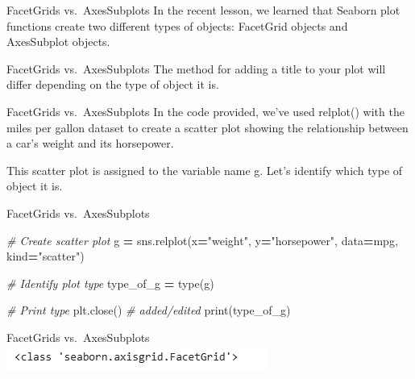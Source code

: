 \documentclass[
  ignorenonframetext,
]{beamer}
\newenvironment{Shaded}{\begin{snugshade}}{\end{snugshade}}
\newcommand{\BuiltInTok}[1]{#1}
\newcommand{\CommentTok}[1]{\textcolor[rgb]{0.56,0.35,0.01}{\textit{#1}}}
\newcommand{\NormalTok}[1]{#1}
\newcommand{\OperatorTok}[1]{\textcolor[rgb]{0.81,0.36,0.00}{\textbf{#1}}}
\newcommand{\StringTok}[1]{\textcolor[rgb]{0.31,0.60,0.02}{#1}}
\begin{document}
\begin{frame}{FacetGrids vs.~AxesSubplots}
\label{facetgrids-vs.-axessubplots}
In the recent lesson, we learned that Seaborn plot functions create two
different types of objects: FacetGrid objects and AxesSubplot objects.
\end{frame}

\begin{frame}{FacetGrids vs.~AxesSubplots}
\label{facetgrids-vs.-axessubplots-1}
The method for adding a title to your plot will differ depending on the
type of object it is.
\end{frame}

\begin{frame}{FacetGrids vs.~AxesSubplots}
\label{facetgrids-vs.-axessubplots-2}
In the code provided, we've used relplot() with the miles per gallon
dataset to create a scatter plot showing the relationship between a
car's weight and its horsepower.

This scatter plot is assigned to the variable name g. Let's identify
which type of object it is.
\end{frame}

\begin{frame}[fragile]{FacetGrids vs.~AxesSubplots}
\label{facetgrids-vs.-axessubplots-3}

\begin{Shaded}
\begin{Highlighting}[]
\CommentTok{\# Create scatter plot}
\NormalTok{g }\OperatorTok{=}\NormalTok{ sns.relplot(x}\OperatorTok{=}\StringTok{"weight"}\NormalTok{, }
\NormalTok{                y}\OperatorTok{=}\StringTok{"horsepower"}\NormalTok{, }
\NormalTok{                data}\OperatorTok{=}\NormalTok{mpg,}
\NormalTok{                kind}\OperatorTok{=}\StringTok{"scatter"}\NormalTok{)}

\CommentTok{\# Identify plot type}
\NormalTok{type\_of\_g }\OperatorTok{=} \BuiltInTok{type}\NormalTok{(g)}

\CommentTok{\# Print type}
\NormalTok{plt.close()  }\CommentTok{\# added/edited}
\BuiltInTok{print}\NormalTok{(type\_of\_g)}
\end{Highlighting}
\end{Shaded}
\end{frame}

\begin{frame}{FacetGrids vs.~AxesSubplots}
\label{facetgrids-vs.-axessubplots-4}
\includegraphics{../images/im304.png}
\end{frame}
\end{document}
